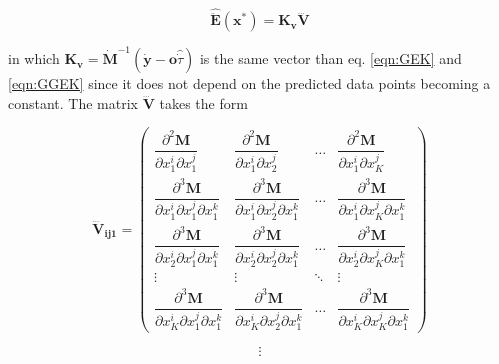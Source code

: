 \documentclass[aps,prb,twocolumn,superscriptaddress,floatfix,longbibliography,10pt]{revtex4-2}
\begin{document}
\begin{equation} \label{eqn:hgek}
\mathbf{\hat{\ddot E}}(\mathbf{x^*}) = \mathbf{K_v}\mathbf{\dddot V}
\end{equation}

in which $\mathbf{K_v} = \mathbf{\dot M}^{-1}(\mathbf{\dot y} - \mathbf{o}\hat{\dot \tau})$ is the same vector than eq. \ref{eqn:GEK} and \ref{eqn:GGEK} since it does not depend on the predicted data points becoming a constant. The matrix $\mathbf{\dddot V}$ takes the form

\begin{equation}
\mathbf{\dddot V_{ij1}} = 
\begin{pmatrix}
\dfrac{\partial^2\mathbf{M}}{\partial x_1^i\partial x_1^j}  & \dfrac{\partial^2\mathbf{M}}{\partial x_1^i\partial x_2^j} & \dots  & \dfrac{\partial^2\mathbf{M}}{\partial x_1^i\partial x_K^j} \\
\dfrac{\partial^3\mathbf{M}}{\partial x_1^i\partial x_1^j\partial x_1^k}  & \dfrac{\partial^3\mathbf{M}}{\partial x_1^i\partial x_2^j\partial x_1^k} & \dots  & \dfrac{\partial^3\mathbf{M}}{\partial x_1^i\partial x_K^j\partial x_1^k} \\
\dfrac{\partial^3\mathbf{M}}{\partial x_2^i\partial x_1^j\partial x_1^k}  & \dfrac{\partial^3\mathbf{M}}{\partial x_2^i\partial x_2^j\partial x_1^k} & \dots  & \dfrac{\partial^3\mathbf{M}}{\partial x_2^i\partial x_K^j\partial x_1^k} \\
\vdots & \vdots & \ddots & \vdots \\
\dfrac{\partial^3\mathbf{M}}{\partial x_K^i\partial x_1^j\partial x_1^k}  & \dfrac{\partial^3\mathbf{M}}{\partial x_K^i\partial x_2^j\partial x_1^k} & \dots  & \dfrac{\partial^3\mathbf{M}}{\partial x_K^i\partial x_K^j\partial x_1^k} \nonumber
\end{pmatrix}
\end{equation}

\begin{equation} \label{eqn:dddV}
\vdots
\end{equation}
\end{document}
